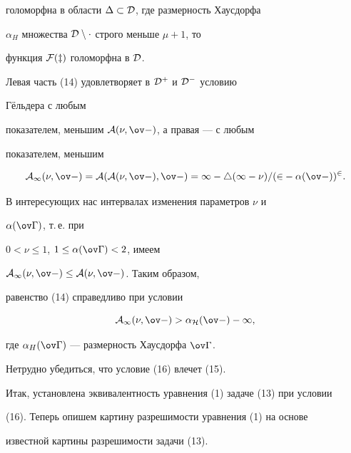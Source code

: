 голоморфна в области $\Delta\subset\cal D$, где размерность Хаусдорфа


$\alpha_H$ множества $\cal D\setminus\Delta$ строго меньше $\mu+1$, то


функция $\cal F(z)$ голоморфна в $\cal D$.





Левая часть (14) удовлетворяет в $\cal D^+$ и $\cal D^-$ условию


Г\"ельдера с любым


показателем, меньшим $\cal A(\nu,\ov\Gamma)$, а правая --- с любым


показателем, меньшим


$$


\cal A_1(\nu,\ov\Gamma)=\cal A(\cal A(\nu,\ov\Gamma),\ov\Gamma)=


1-4(1-\nu)/(2-\alpha(\ov\Gamma))^2.


$$


В интересующих нас интервалах изменения параметров $\nu$ и


$\alpha(\ov\Gamma)$, т.\,е. при


$0<\nu\le 1$, $1\le\alpha(\ov\Gamma)<2$, имеем


$\cal A_1(\nu,\ov\Gamma)\le\cal A(\nu,\ov\Gamma)$. Таким образом,


равенство (14) справедливо при условии


\begin{equation}


\cal A_1(\nu,\ov\Gamma)>\alpha_H(\ov\Gamma)-1,


\end{equation}


где $\alpha_H(\ov\Gamma)$ --- размерность Хаусдорфа $\ov\Gamma$.


Нетрудно убедиться, что условие (16) влечет (15).





Итак, установлена эквивалентность уравнения (1) задаче (13) при условии


(16). Теперь опишем картину разрешимости уравнения (1) на основе


известной \cite{11} картины разрешимости задачи (13).





